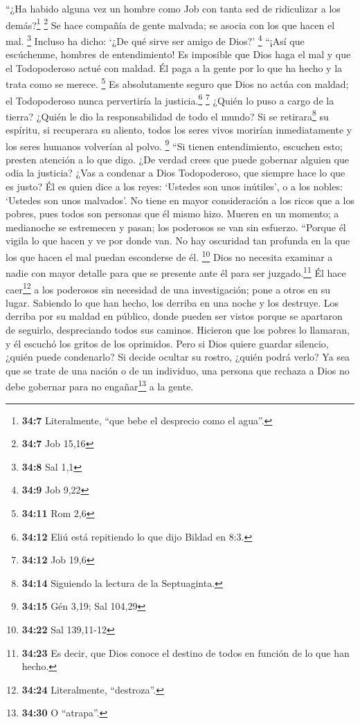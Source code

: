  ``¿Ha habido alguna vez un hombre como Job con tanta sed
de ridiculizar a los demás?\footnote{\textbf{34:7} Literalmente, ``que
  bebe el desprecio como el agua''.} \footnote{\textbf{34:7} Job 15,16}
 Se hace compañía de gente malvada; se asocia con los que
hacen el mal. \footnote{\textbf{34:8} Sal 1,1}  Incluso ha
dicho: `¿De qué sirve ser amigo de Dios?' \footnote{\textbf{34:9} Job
  9,22}  ``¡Así que escúchenme, hombres de entendimiento!
Es imposible que Dios haga el mal y que el Todopoderoso actué con
maldad.  Él paga a la gente por lo que ha hecho y la
trata como se merece. \footnote{\textbf{34:11} Rom 2,6} 
Es absolutamente seguro que Dios no actúa con maldad; el Todopoderoso
nunca pervertiría la justicia.\footnote{\textbf{34:12} Eliú está
  repitiendo lo que dijo Bildad en 8:3.} \footnote{\textbf{34:12} Job
  19,6}  ¿Quién lo puso a cargo de la tierra? ¿Quién le
dio la responsabilidad de todo el mundo?  Si se
retirara\footnote{\textbf{34:14} Siguiendo la lectura de la Septuaginta.}
su espíritu, si recuperara su aliento,  todos los seres
vivos morirían inmediatamente y los seres humanos volverían al polvo.
\footnote{\textbf{34:15} Gén 3,19; Sal 104,29}  ``Si
tienen entendimiento, escuchen esto; presten atención a lo que digo.
 ¿De verdad crees que puede gobernar alguien que odia la
justicia? ¿Vas a condenar a Dios Todopoderoso, que siempre hace lo que
es justo?  Él es quien dice a los reyes: `Ustedes son
unos inútiles', o a los nobles: `Ustedes son unos malvados'.
 No tiene en mayor consideración a los ricos que a los
pobres, pues todos son personas que él mismo hizo. 
Mueren en un momento; a medianoche se estremecen y pasan; los poderosos
se van sin esfuerzo.  ``Porque él vigila lo que hacen y
ve por donde van.  No hay oscuridad tan profunda en la
que los que hacen el mal puedan esconderse de él. \footnote{\textbf{34:22}
  Sal 139,11-12}  Dios no necesita examinar a nadie con
mayor detalle para que se presente ante él para ser juzgado.\footnote{\textbf{34:23}
  Es decir, que Dios conoce el destino de todos en función de lo que han
  hecho.}  Él hace caer\footnote{\textbf{34:24}
  Literalmente, ``destroza''.} a los poderosos sin necesidad de una
investigación; pone a otros en su lugar.  Sabiendo lo que
han hecho, los derriba en una noche y los destruye.  Los
derriba por su maldad en público, donde pueden ser vistos
 porque se apartaron de seguirlo, despreciando todos sus
caminos.  Hicieron que los pobres lo llamaran, y él
escuchó los gritos de los oprimidos.  Pero si Dios quiere
guardar silencio, ¿quién puede condenarlo? Si decide ocultar su rostro,
¿quién podrá verlo? Ya sea que se trate de una nación o de un individuo,
 una persona que rechaza a Dios no debe gobernar para no
engañar\footnote{\textbf{34:30} O ``atrapa''.} a la gente.

